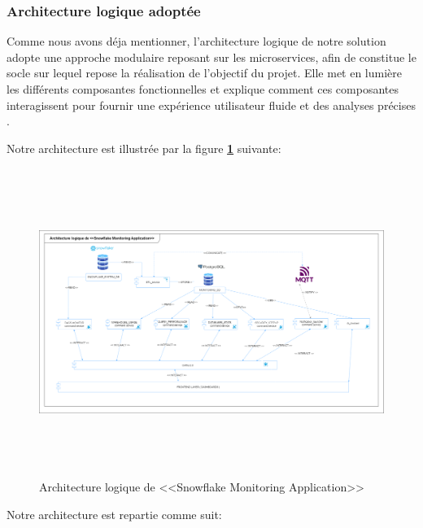 \subsubsection{Architecture logique adoptée} 
\par Comme nous avons déja mentionner, l'architecture logique de notre solution adopte une approche modulaire reposant sur
 les microservices, afin de constitue le socle sur lequel repose la réalisation de l'objectif du projet. 
 Elle met en lumière les différents composantes fonctionnelles et explique comment ces composantes interagissent pour fournir une expérience utilisateur fluide et des analyses précises \cite{archi_log}. 
 \par Notre architecture est illustrée par la figure \textbf{\ref{fig:arch_log}} suivante:
        \begin{figure}[H]
        \centering
        \includegraphics[width = 1\linewidth ,height=10cm]{img/conception/archi.png}
        \caption{Architecture logique de <<Snowflake Monitoring Application>>}
        \label{fig:arch_log}
        \end{figure}
    \par Notre architecture est repartie comme suit: 

